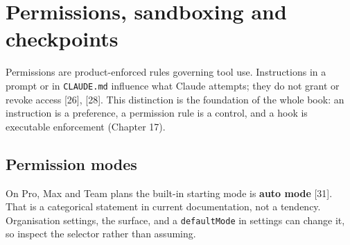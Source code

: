 \documentclass[11pt,a4paper,twoside,openany]{book}
\newcommand{\chaptertitlelabel}{}
\begin{document}
\FloatBarrier
\renewcommand{\chaptertitlelabel}{Part II \textperiodcentered\ Chapter 7}
\setcounter{chapter}{6}
\chapter{Permissions, sandboxing and checkpoints}

Permissions are product-enforced rules governing tool use. Instructions in a prompt or in \texttt{CLAUDE.\allowbreak{}md} influence what Claude attempts; they do not grant or revoke access [26], [28]. This distinction is the foundation of the whole book: an instruction is a preference, a permission rule is a control, and a hook is executable enforcement (Chapter 17).


\FloatBarrier
\setcounter{section}{0}
\section{Permission modes}

On Pro, Max and Team plans the built-in starting mode is \textbf{auto mode} [31]. That is a categorical statement in current documentation, not a tendency. Organisation settings, the surface, and a \texttt{default\allowbreak{}Mode} in settings can change it, so inspect the selector rather than assuming.
\end{document}
